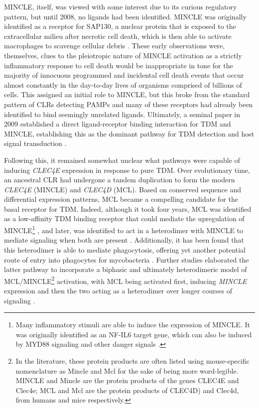 MINCLE, itself, was viewed with some interest due to its curious regulatory pattern, but until 2008, no ligands had been identified. MINCLE was originally identified as a receptor for SAP130, a nuclear protein that is exposed to the extracellular milieu after necrotic cell death, which is then able to activate macrophages to scavenge cellular debris \citep{Yamasaki2008}. These early observations were, themselves, clues to the pleiotropic nature of MINCLE activation as a strictly inflammatory response to cell death would be inappropriate in tone for the majority of innocuous programmed and incidental cell death events that occur almost constantly in the day\hyp{}to\hyp{}day lives of organisms comprised of billions of cells. This assigned an initial role to MINCLE, but this broke from the standard pattern of CLRs detecting PAMPs and many of these receptors had already been identified to bind seemingly unrelated ligands. Ultimately, a seminal paper in 2009 established a direct ligand\hyp{}receptor binding interaction for TDM and MINCLE, establishing this as the dominant pathway for TDM detection and host signal transduction \citep{Ishikawa2009}. 

Following this, it remained somewhat unclear what pathways were capable of inducing \textit{CLEC4E} expression in response to pure TDM. Over evolutionary time, an ancestral CLR had undergone a tandem duplication to form the modern \textit{CLEC4E} (MINCLE) and \textit{CLEC4D} (MCL). Based on conserved sequence and differential expression patterns, MCL became a compelling candidate for the basal receptor for TDM. Indeed, although it took four years, MCL was identified as a low\hyp{}affinity TDM binding receptor that could mediate the upregulation of MINCLE\footnote{Many inflammatory stimuli are able to induce the expression of MINCLE. It was originally identified as an NF-IL6 target gene, which can also be induced by MYD88 signaling and other danger signals \citep{Kerscher2016b}.} \citep{Miyake2013}, and later, was identified to act in a heterodimer with MINCLE to mediate signaling when both are present \citep{LobatoPascual2013, Kerscher2016a, Yamasaki2013, Furukawa2013}. Additionally, it has been found that this heterodimer is able to mediate phagocytosis, offering yet another potential route of entry into phagocytes for mycobacteria \citep{Yamasaki2013, LobatoPascual2013}. Further studies elaborated the latter pathway to incorporate a biphasic and ultimately heterodimeric model of MCL/MINCLE\footnote{In the literature, these protein products are often listed using mouse\hyp{}specific nomenclature as Mincle and Mcl for the sake of being more word\hyp{}legible. MINCLE and Mincle are the protein products of the genes CLEC4E and Clec4e; MCL and Mcl are the protein products of CLEC4D) and Clec4d, from humans and mice respectively.} activation, with MCL being activated first, inducing \textit{MINCLE} expression and then the two acting as a heterodimer over longer courses of signaling \citep{LobatoPascual2013, Yamasaki2013, Furukawa2013}.

